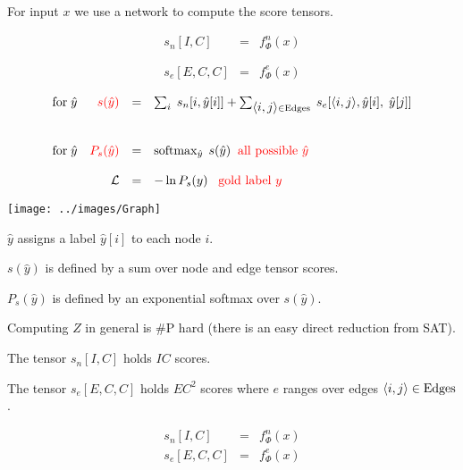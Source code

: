 {

For input $x$ we use a network to compute the score tensors.

\vfill
\begin{eqnarray*}
s_n[I,C] & = & f^n_\Phi(x) \\
\\
\\
s_e[E,C,C] & = & f^e_\Phi(x)
\end{eqnarray*}


$$\begin{array}{lrcl}
\mbox{for}\;\hat{y} & {\color{red} s(\hat{y})} & = & \sum_i\;s_n[i,\hat{y}[i]] + \sum_{{\mbox{$\langle i,j\rangle$}} \in \mathrm{Edges}}\;s_e[{\mbox{$\langle i,j\rangle$}},\hat{y}[i],\;\hat{y}[j]] \\
\\
\\
\mbox{for}\;\hat{y} & {\color{red} P_s(\hat{y})} & = & \operatorname*{softmax}_{\hat{y}}\;s(\hat{y}) \;\;\mbox{\color{red} all possible $\hat{y}$} \\
\\
 & {\cal L} & = & - \ln P_s(y) \;\;\;{\color{red} \mbox{gold label $y$}}
\end{array}$$

\centerline{\texttt{[image: ../images/Graph]}}
\medskip
$\hat{y} $ assigns a label $\hat{y}[i]$ to each node $i$.

\vfill
$s(\hat{y})$ is defined by a sum over node and edge tensor scores.

\vfill
$P_s(\hat{y})$ is defined by an exponential softmax over $s(\hat{y})$.

\vfill
Computing $Z$ in general is \#P hard (there is an easy direct reduction from SAT).


The tensor {\color{red} $s_n[I,C]$} holds $IC$ scores.

\vfill
The tensor {\color{red} $s_e[E,C,C]$} holds $EC^2$ scores where $e$ ranges over edges ${\mbox{$\langle i,j\rangle$}} \in \mathrm{Edges}$.


\begin{eqnarray*}
s_n[I,C] & = & f^n_\Phi(x) \\
s_e[E,C,C] & = & f^e_\Phi(x)
\end{eqnarray*}

}
